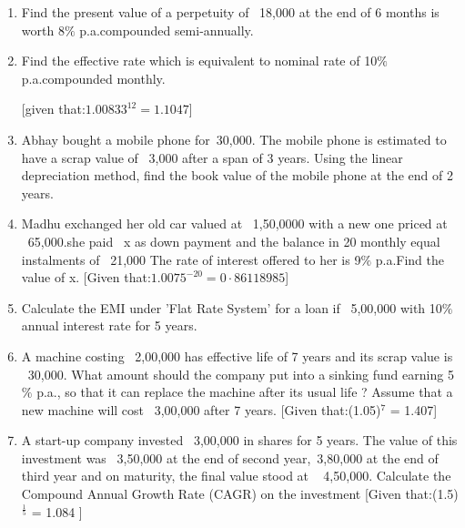 \documentclass{article}
\begin{document}
         \pagebreak
         \begin{enumerate} 
\item Find the present value of a perpetuity of \rupee~18,000 at the end of 6 months is worth 8$\%$ p.a.compounded semi-annually.
\item Find the effective rate which is equivalent to nominal rate of 10$\%$ p.a.compounded monthly.

    [given that:$1.00833^{12} = 1.1047$]
    \item Abhay bought a mobile phone for\rupee~30,000. The mobile phone is estimated to have a scrap value of \rupee~3,000 after a span of 3 years. Using the linear depreciation method, find the book value of the mobile phone at the end of 2 years.    
\item Madhu exchanged her old car valued at \rupee~1,50,0000 with a new one priced at  \rupee~65,000.she paid \rupee~x as down payment and the balance in 20 monthly equal instalments of \rupee~21,000 The rate of interest offered to her is 9$\%$ p.a.Find the value of x.
    [Given that:$1.0075^{-20} = 0·86118985$] 
    \item Calculate the EMI under 'Flat Rate System' for a loan if 
\rupee~5,00,000 with 10$\%$ annual interest rate for 5 years.  
\item A machine costing \rupee~2,00,000 has effective life of 7 years and its scrap value is \rupee~30,000. What amount should the company put into a sinking fund earning 5 $\%$ p.a., so that it can replace the machine after its usual life ? Assume that a new machine will cost \rupee~3,00,000 after 7 years. 
[Given that:(1.05)$^7$ = 1.407]
\item A start-up company invested \rupee~3,00,000 in shares for 5 years. The value of this investment was \rupee~3,50,000 at the end of second year,\rupee~3,80,000 at the end of third year and on maturity, the final value stood at \rupee~ 4,50,000. Calculate the Compound Annual Growth Rate (CAGR) on the investment
[Given that:(1.5)$^\frac{1}{5}$ = 1.084 ]

     \end{enumerate}
         
\end{document}
